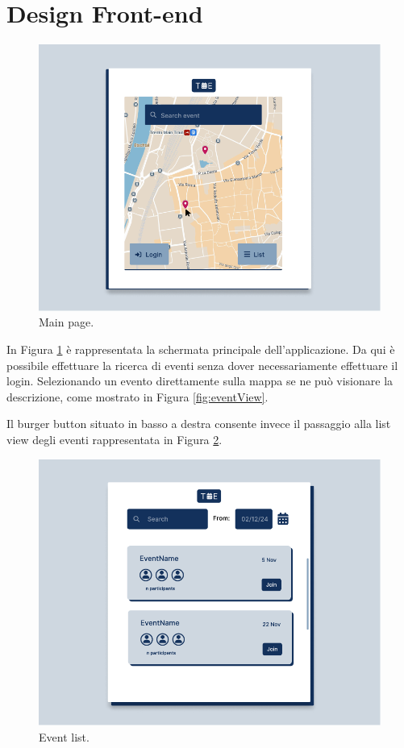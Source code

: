 \documentclass[9pt]{extarticle}
\begin{document}
\section{Design Front-end}

\begin{figure}[!htb]
	\centering
	\includegraphics[width=.7\linewidth]{./images/MainPage.pdf}
	\caption{Main page.}
	\label{fig:mainPage}
\end{figure}

In Figura \ref{fig:mainPage} è rappresentata la schermata principale dell'applicazione. Da qui è possibile effettuare la ricerca di eventi senza dover necessariamente effettuare il login. Selezionando un evento direttamente sulla mappa se ne può visionare la descrizione, come mostrato in Figura \ref{fig:eventView}.

Il burger button situato in basso a destra consente invece il passaggio alla list view degli eventi rappresentata in Figura \ref{fig:eventListSearch}.

\begin{figure}[!htb]
	\centering
	\includegraphics[width=.7\linewidth]{./images/EventListSearch.pdf}
	\caption{Event list.}
	\label{fig:eventListSearch}
\end{figure}
\end{document}
